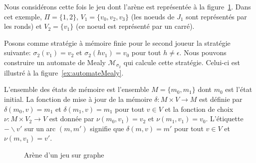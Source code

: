 \begin{exemple}
	
	Nous considérons cette fois le jeu dont l'arène est représentée à la figure~\ref{ex:jeuSurGraphe2}. Dans cet exemple, $\Pi = \{ 1, 2 \}$, $V_1 = \{ v_0, v_2, v_3 \}$ (les noeuds de $J_1$ sont représentés par les ronds) et $V_2 = \{ v_1 \} $ (ce noeud est représenté par un carré).
	
	Posons comme stratégie à mémoire finie pour le second joueur la stratégie suivante: $\sigma_2(v_1) = v_2$ et $ \sigma_2(hv_1) = v_0$ pour tout $h \neq \epsilon$. Nous pouvons construire un automate de Mealy $\mathcal{M}_{\sigma_2}$ qui calcule cette stratégie. Celui-ci est illustré à la figure~\ref{ex:automateMealy}. 
	
	L'ensemble des états de mémoire est l'ensemble $M = \{ m_0, m_1 \}$ dont $m_0$ est l'état initial. La fonction de mise à jour de la mémoire $\delta : M \times V \rightarrow M$ est définie par $\delta(m_0, v) = m_1$ et $ \delta(m_1, v) = m_1$ pour tout $v \in V$  et la fonction de choix $\nu : M \times V_2 \rightarrow V$ est donnée par $\nu(m_0, v_1) = v_2$ et $\nu(m_1, v_1) = v_0$. 
	L'étiquette $- \backslash v'$ sur un arc $(m,m')$ signifie que $\delta(m,v) = m'$ pour tout $v\in V$ et $\nu(m,v_1) = v'$.
	
	\begin{figure}
	   \begin{minipage}[c]{.46\linewidth}
			\centering
			\caption{Arène d'un jeu sur graphe}
			\label{ex:jeuSurGraphe2}
			
	   \end{minipage} \hfill
	   \begin{minipage}[c]{.46\linewidth}
			\centering
\end{minipage}
\end{figure}
\end{exemple}
